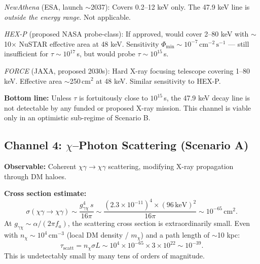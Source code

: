 \documentclass[12pt,a4paper]{article}
\newcommand{\keV}{\,\mathrm{keV}}
\newcommand{\cms}{\,\mathrm{cm}^{-2}\,\mathrm{s}^{-1}}
\begin{document}
\emph{NewAthena} (ESA, launch $\sim$2037): Covers 0.2--12 keV only.
The 47.9 keV line is \emph{outside the energy range}. Not applicable.

\emph{HEX-P} (proposed NASA probe-class): If approved, would cover
2--80 keV with $\sim$10$\times$ NuSTAR effective area at 48 keV.
Sensitivity $\Phi_\mathrm{min} \sim 10^{-7}\cms$ --- still
insufficient for $\tau \sim 10^{17}$\,s, but would probe
$\tau \sim 10^{15}$\,s.

\emph{FORCE} (JAXA, proposed 2030s): Hard X-ray focusing telescope
covering 1--80 keV. Effective area $\sim$250\,cm$^2$ at 48 keV.
Similar sensitivity to HEX-P.

\textbf{Bottom line:} Unless $\tau$ is fortuitously close to $10^{15}$\,s,
the 47.9 keV decay line is not detectable by any funded or proposed
X-ray mission. This channel is viable only in an optimistic sub-regime
of Scenario B.

\begin{center}
\end{center}

\subsection{Channel 4: $\chi$--Photon Scattering (Scenario A)}
\label{sec:scattering}

\textbf{Observable:} Coherent $\chi\gamma \to \chi\gamma$ scattering,
modifying X-ray propagation through DM haloes.

\textbf{Cross section estimate:}
\begin{equation}
\sigma(\chi\gamma \to \chi\gamma) \sim \frac{g_{\gamma\chi}^4\,s}{16\pi}
\sim \frac{(2.3 \times 10^{-11})^4 \times (96\keV)^2}{16\pi}
\sim 10^{-65}\,\mathrm{cm}^2.
\end{equation}
At $g_{\gamma\chi} \sim \alpha/(2\pi f_a)$, the scattering cross
section is extraordinarily small. Even with $n_\chi \sim 10^4$\,cm$^{-3}$
(local DM density / $m_\chi$) and a path length of $\sim$10 kpc:
\begin{equation}
\tau_\mathrm{scatt} = n_\chi \sigma L \sim 10^4 \times 10^{-65}
\times 3 \times 10^{22} \sim 10^{-39}.
\end{equation}
This is undetectably small by many tens of orders of magnitude.
\end{document}
